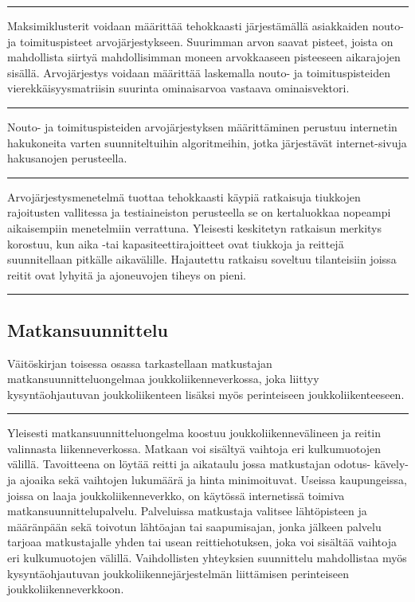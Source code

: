\documentclass[a4paper,12pt]{article}
\newcommand*\sepline{%
  \begin{center}
    \rule[1ex]{.5\textwidth}{.5pt}
  \end{center}}
\begin{document}
\sepline

Maksimiklusterit voidaan määrittää tehokkaasti järjestämällä asiakkaiden nouto- ja toimituspisteet arvojärjestykseen. 
Suurimman arvon saavat pisteet, joista on mahdollista siirtyä mahdollisimman moneen arvokkaaseen pisteeseen aikarajojen sisällä.
Arvojärjestys voidaan määrittää laskemalla nouto- ja toimituspisteiden vierekkäisyysmatriisin suurinta ominaisarvoa vastaava ominaisvektori.

\sepline

Nouto- ja toimituspisteiden arvojärjestyksen määrittäminen perustuu internetin hakukoneita varten suunniteltuihin algoritmeihin, 
jotka järjestävät internet-sivuja hakusanojen perusteella. 

\sepline

Arvojärjestysmenetelmä tuottaa tehokkaasti käypiä ratkaisuja tiukkojen 
rajoitusten vallitessa ja testiaineiston perusteella se on kertaluokkaa nopeampi aikaisempiin menetelmiin verrattuna.
Yleisesti keskitetyn ratkaisun merkitys korostuu, kun aika -tai kapasiteettirajoitteet ovat tiukkoja ja reittejä 
suunnitellaan pitkälle aikavälille. Hajautettu ratkaisu soveltuu tilanteisiin joissa reitit ovat lyhyitä ja
ajoneuvojen tiheys on pieni.

\sepline



\subsection*{Matkansuunnittelu}
Väitöskirjan toisessa osassa tarkastellaan matkustajan matkansuunnitteluongelmaa joukkoliikenneverkossa, joka liittyy
kysyntäohjautuvan joukkoliikenteen lisäksi myös perinteiseen joukkoliikenteeseen. 
\sepline

Yleisesti matkansuunnitteluongelma koostuu joukkoliikennevälineen ja reitin valinnasta liikenneverkossa. Matkaan
voi sisältyä vaihtoja eri kulkumuotojen välillä. Tavoitteena on löytää reitti ja aikataulu jossa matkustajan
odotus- kävely- ja ajoaika sekä vaihtojen lukumäärä ja hinta minimoituvat. Useissa kaupungeissa, joissa 
on laaja joukkoliikenneverkko, on käytössä internetissä toimiva matkansuunnittelupalvelu. Palveluissa 
matkustaja valitsee lähtöpisteen ja määränpään sekä toivotun lähtöajan tai saapumisajan, jonka jälkeen
palvelu tarjoaa matkustajalle yhden tai usean reittiehotuksen, joka voi sisältää vaihtoja eri kulkumuotojen välillä.
Vaihdollisten yhteyksien suunnittelu mahdollistaa myös kysyntäohjautuvan joukkoliikennejärjestelmän liittämisen
perinteiseen joukkoliikenneverkkoon.
\end{document}
